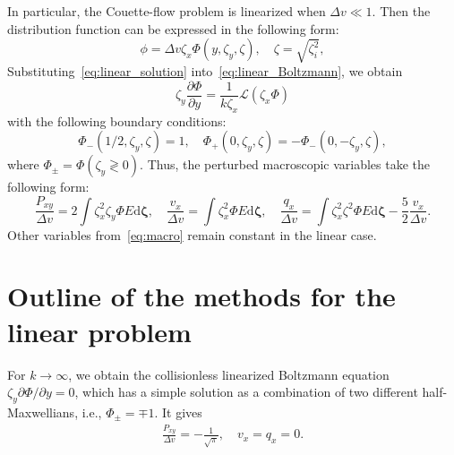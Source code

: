 \documentclass[aip,pof,preprint]{revtex4-1}
\newcommand{\dd}{\mathrm{d}}
\newcommand{\pder}[2][]{\frac{\partial#1}{\partial#2}}
\newcommand{\Pder}[2][]{\partial#1/\partial#2}
\newcommand{\dzeta}{\boldsymbol{\dd\zeta}}
\begin{document}
In particular, the Couette-flow problem is linearized when \(\Delta{v}\ll 1\).
Then the distribution function can be expressed in the following form:
\begin{equation}\label{eq:linear_solution}
    \phi = \Delta{v} \zeta_x \Phi(y,\zeta_y,\zeta), \quad \zeta = \sqrt{\zeta_i^2},
\end{equation}
Substituting~\eqref{eq:linear_solution} into~\eqref{eq:linear_Boltzmann}, we obtain
\begin{equation}\label{eq:linear_equation}
    \zeta_y \pder[\Phi]{y} = \frac1{k\zeta_x}\mathcal{L}(\zeta_x\Phi)
\end{equation}
with the following boundary conditions:
\begin{equation}\label{eq:linear_bc}
    \Phi_-(1/2,\zeta_y,\zeta) = 1, \quad \Phi_+(0,\zeta_y,\zeta) = -\Phi_-(0,-\zeta_y,\zeta),
\end{equation}
where \(\Phi_\pm = \Phi(\zeta_y \gtrless 0)\).
Thus, the perturbed macroscopic variables take the following form:
\begin{equation}\label{eq:linear_macro}
    \frac{P_{xy}}{\Delta{v}} = 2\int \zeta_x^2 \zeta_y \Phi E\dzeta, \quad
    \frac{v_x}{\Delta{v}} = \int \zeta_x^2 \Phi E\dzeta, \quad
    \frac{q_x}{\Delta{v}} = \int \zeta_x^2 \zeta^2 \Phi E\dzeta - \frac52 \frac{v_x}{\Delta{v}}.
\end{equation}
Other variables from~\eqref{eq:macro} remain constant in the linear case.

\section{Outline of the methods for the linear problem}

For \(k\to\infty\), we obtain the collisionless linearized Boltzmann equation \(\zeta_y\Pder[\Phi]{y} = 0\),
which has a simple solution as a combination of two different half-Maxwellians, i.e., \(\Phi_\pm = \mp 1\).
It gives
\begin{gather}\label{eq:linear_free_macro}
    \frac{P_{xy}}{\Delta{v}} = -\frac1{\sqrt\pi}, \quad v_x = q_x = 0.
\end{gather}
\end{document}
